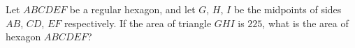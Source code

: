 Let $ABCDEF$ be a regular hexagon, and let $G$, $H$, $I$ be the midpoints of sides $AB$, $CD$, $EF$ respectively. If the area of triangle $GHI$ is $225$, what is the area of hexagon $ABCDEF$?
